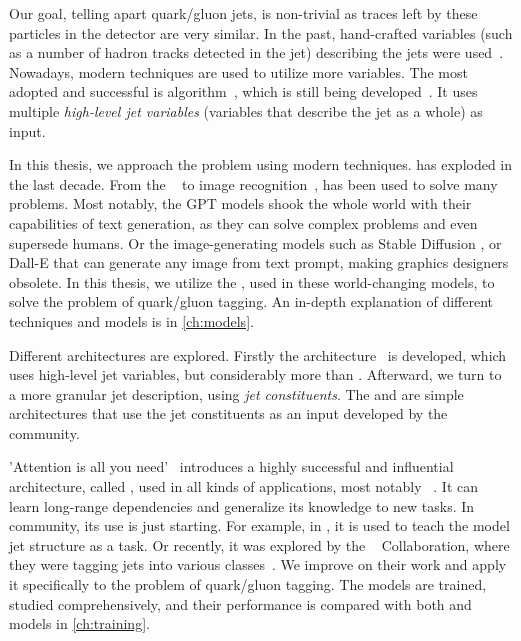 Our goal, telling apart quark/gluon jets, is non-trivial as traces left by these particles in the detector are very similar.
In the past, hand-crafted variables (such as a number of hadron tracks detected in the jet) describing the jets were used~\cite{ntrk_tag}.
Nowadays, modern \ml techniques are used to utilize more variables.
The most adopted and successful is \bdt algorithm~\cite{bdt}, which is still being developed~\cite{bdt_tag}.
It uses multiple \emph{high-level jet variables} (variables that describe the jet as a whole) as input.

In this thesis, we approach the problem using modern \dl techniques.
\dl has exploded in the last decade.
From the \nlp~\cite{bert} to image recognition~\cite{deit3}, \dl has been used to solve many problems.
Most notably, the GPT \cite{gpt3,gpt4} models shook the whole world with their capabilities of text generation, as they can solve complex problems and even supersede humans. 
Or the image-generating models such as Stable Diffusion \cite{stable_diff}, or Dall-E \cite{dalle} that can generate any image from text prompt, making graphics designers obsolete.
In this thesis, we utilize the \dl, used in these world-changing models, to solve the problem of quark/gluon tagging.
An in-depth explanation of different \dl techniques and models is in \cref{ch:models}.

Different architectures are explored.
Firstly the \highway architecture~\cite{highway} is developed, which uses high-level jet variables, but considerably more than \bdt. 
Afterward, we turn to a more granular jet description, using \emph{jet constituents}. 
The \EFN and \PFN \cite{efn} are simple architectures that use the jet constituents as an input developed by the \HEP community.

'Attention is all you need'~\cite{att_is_all} introduces a highly successful and influential architecture, called \trans, used in all kinds of applications, most notably \nlp~\cite{bert,gpt3,gpt4,deit3,cait}.
It can learn long-range dependencies and generalize its knowledge to new tasks.
In \HEP community, its use is just starting.
For example, in \cite{qcd_as_nlp}, it is used to teach the model jet structure as a \nlp task.  
Or recently, it was explored by the \CMS~\cite{cms} Collaboration, where they were tagging jets into various classes~\cite{part}.
We improve on their work and apply it specifically to the problem of quark/gluon tagging.
The models are trained, studied comprehensively, and their performance is compared with both \ml and \dl models in \cref{ch:training}.





